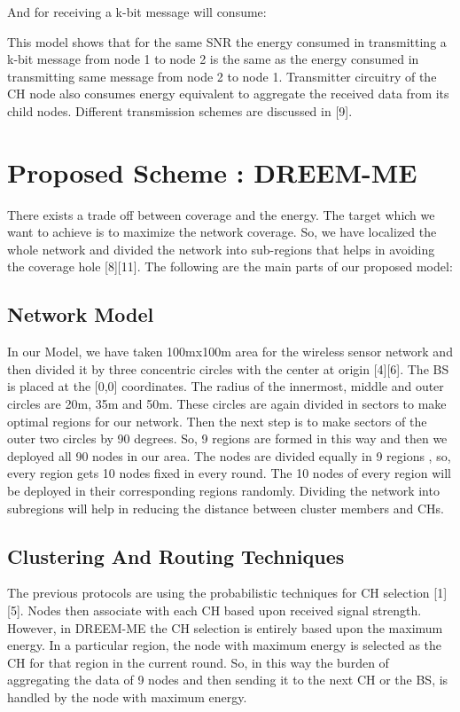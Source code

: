\documentclass[journal]{IEEEtran}
\begin{document}
 And for receiving a k-bit message will consume:



This model shows that for the same SNR the energy consumed in transmitting a k-bit message from node 1 to node 2 is the same as the energy consumed in transmitting same message from node 2 to node 1. Transmitter circuitry of the CH node also consumes  energy equivalent to aggregate the received data from its child nodes. Different transmission schemes are discussed in [9].

\section{Proposed Scheme : DREEM-ME}
There exists a trade off between coverage and the energy. The target which we want to achieve is to maximize the network coverage. So, we have localized the whole network and divided the network into sub-regions that helps in avoiding the coverage hole [8][11]. The following are the main parts of our proposed model:

\subsection{Network Model}

In our Model, we have taken 100mx100m area for the wireless sensor network and then divided it by three concentric circles with the center at origin [4][6]. The BS is placed at the [0,0] coordinates. The radius of the innermost, middle and outer circles are 20m, 35m and 50m. These circles are again divided in sectors to make optimal regions for our network. Then the next step is to make sectors of the outer two circles by 90 degrees. So, 9 regions are formed in this way and then we deployed all 90 nodes in our area. The nodes are divided equally in 9 regions , so, every region gets 10 nodes fixed in every round. The 10 nodes of every region will be deployed in their corresponding regions randomly. Dividing the network into subregions will help in reducing the distance between cluster members and CHs.

\subsection{ Clustering And Routing Techniques }

The previous protocols are using the probabilistic techniques for CH selection [1][5]. Nodes then associate with each CH based upon received signal strength. However, in DREEM-ME the CH selection is entirely based upon the maximum energy. In a particular region, the node with maximum energy is selected as the CH for that region in the current round. So, in this way the burden of aggregating the data of 9 nodes and then sending it to the next CH or the BS, is handled by the node with maximum energy.
\end{document}

